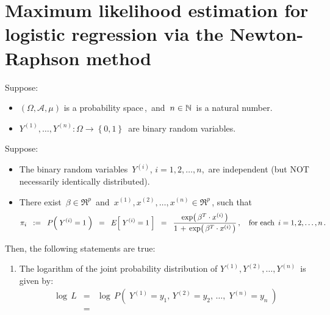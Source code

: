 

\section{Maximum likelihood estimation for logistic regression via the Newton-Raphson method}
\setcounter{theorem}{0}
\setcounter{equation}{0}

\renewcommand{\theenumi}{\roman{enumi}}
\renewcommand{\labelenumi}{\textnormal{(\theenumi)}$\;\;$}


\begin{proposition}
\mbox{}\vskip 0.1cm\noindent
Suppose:
\begin{itemize}
\item
	$\left(\Omega,\mathcal{A},\mu\right)$ is a probability space\,,
	\,and
	\,$n \in \mathbb{N}$\, is a natural number.
\item
	$Y^{(1)}, \ldots, Y^{(n)} : \Omega \longrightarrow \left\{0,1\right\}$\,
	are binary random variables.
\end{itemize}
Suppose:
\begin{itemize}
\item
	The binary random variables \,$Y^{(i)}$, $i = 1, 2, \ldots, n$,\,
	are independent (but NOT necessarily identically distributed).
\item
	There exist
	\,$\beta \in \Re^{p}$\,
	and
	\,$x^{(1)}, x^{(2)}, \ldots, x^{(n)} \in \Re^{p}$\,,
	such that
	\begin{equation*}
	\pi_{i}
	\;\; := \;\;
		P\!\left(\; Y^{(i)} = 1 \;\right)
	\;\; = \;\;
		E\!\left[\; Y^{(i)}  = 1 \;\right]
	\;\; = \;\;
		\dfrac{
			\exp\!\left(\,\beta^{T} \cdot x^{(i)} \,\right)
			}{
			1 \,+\, \exp\!\left(\,\beta^{T} \cdot x^{(i)} \,\right)
			}\,,
	\quad
	\textnormal{for each \,$i = 1,2,\ldots,n$}\,.
	\end{equation*}
\end{itemize}
Then, the following statements are true:
\begin{enumerate}
\item
	The logarithm of the joint probability distribution of
	\;$Y^{(1)},Y^{(2)},\ldots,Y^{(n)}$\, is given by:
	\begin{eqnarray*}
	\log\,L
		&=&
		\log\,P\!\left(\; Y^{(1)}=y_{1},\,Y^{(2)}=y_{2},\,\ldots,\;Y^{(n)}=y_{n} \;\right)
	\\
	&=&

\end{eqnarray*}
\end{enumerate}
\end{proposition}
